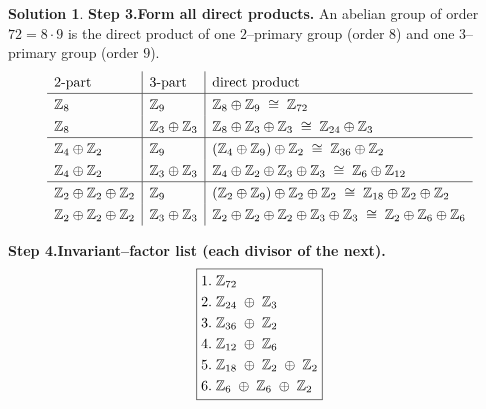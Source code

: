 \documentclass[12pt]{article}
\theoremstyle{definition} %
\newtheorem{solution}{Solution}
\theoremstyle{plain} %
\begin{document}
\begin{solution}
                \textbf{Step 3.\;Form all direct products.}  
                An abelian group of order $72=8\cdot9$
                is the direct product of one $2$–primary group (order $8$)
                and one $3$–primary group (order $9$).
                \[
                  \renewcommand{\arraystretch}{1.3}
                  \begin{array}{l|l|l}   %
                  \text{$2$-part} & \text{$3$-part} & \text{direct product}\\\hline
                  \Bbb Z_{8} & \Bbb Z_{9} & \Bbb Z_{8}\oplus\Bbb Z_{9}\;\cong\;\Bbb Z_{72}\\
                  \Bbb Z_{8} & \Bbb Z_{3}\oplus\Bbb Z_{3} 
                             & \Bbb Z_{8}\oplus\Bbb Z_{3}\oplus\Bbb Z_{3}
                               \;\cong\;\Bbb Z_{24}\oplus\Bbb Z_{3}\\\hline
                  \Bbb Z_{4}\oplus\Bbb Z_{2} & \Bbb Z_{9} 
                             & (\Bbb Z_{4}\oplus\Bbb Z_{9})\oplus\Bbb Z_{2}
                               \;\cong\;\Bbb Z_{36}\oplus\Bbb Z_{2}\\
                  \Bbb Z_{4}\oplus\Bbb Z_{2} & \Bbb Z_{3}\oplus\Bbb Z_{3}
                             & \Bbb Z_{4}\oplus\Bbb Z_{2}\oplus\Bbb Z_{3}\oplus\Bbb Z_{3}
                               \;\cong\;\Bbb Z_{6}\oplus\Bbb Z_{12}\\\hline
                  \Bbb Z_{2}\oplus\Bbb Z_{2}\oplus\Bbb Z_{2} & \Bbb Z_{9}
                             & (\Bbb Z_{2}\oplus\Bbb Z_{9})\oplus\Bbb Z_{2}\oplus\Bbb Z_{2}
                               \;\cong\;\Bbb Z_{18}\oplus\Bbb Z_{2}\oplus\Bbb Z_{2}\\
                  \Bbb Z_{2}\oplus\Bbb Z_{2}\oplus\Bbb Z_{2} & \Bbb Z_{3}\oplus\Bbb Z_{3}
                             & \Bbb Z_{2}\oplus\Bbb Z_{2}\oplus\Bbb Z_{2}\oplus
                               \Bbb Z_{3}\oplus\Bbb Z_{3}
                               \;\cong\;\Bbb Z_{2}\oplus\Bbb Z_{6}\oplus\Bbb Z_{6}
                  \end{array}
                  \] 
                
                \textbf{Step 4.\;Invariant–factor list (each divisor of the next).}
                \[
                \boxed{
                \begin{aligned}
                1.\;&\Bbb Z_{72}\\
                2.\;&\Bbb Z_{24}\;\oplus\;\Bbb Z_{3}\\
                3.\;&\Bbb Z_{36}\;\oplus\;\Bbb Z_{2}\\
                4.\;&\Bbb Z_{12}\;\oplus\;\Bbb Z_{6}\\
                5.\;&\Bbb Z_{18}\;\oplus\;\Bbb Z_{2}\;\oplus\;\Bbb Z_{2}\\
                6.\;&\Bbb Z_{6}\;\oplus\;\Bbb Z_{6}\;\oplus\;\Bbb Z_{2}
                \end{aligned}}
                \]
                

\end{solution}
\end{document}
